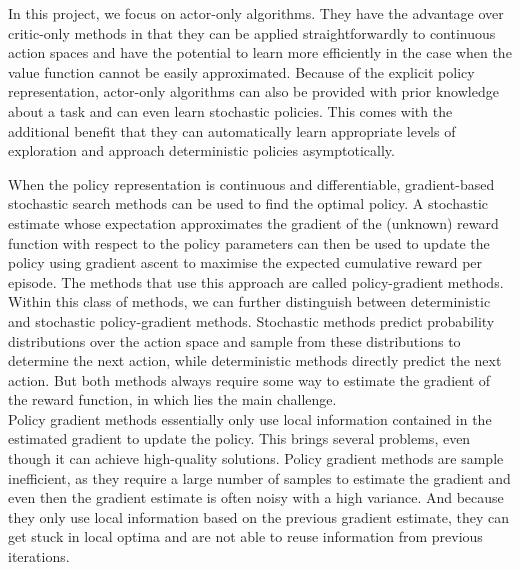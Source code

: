 \documentclass[10pt]{article}
\begin{document}
In this project, we focus on actor-only algorithms.
They have the advantage over critic-only methods in that they can be applied
straightforwardly to continuous action spaces and have the potential to learn more
efficiently in the case when the value function cannot be easily approximated.
Because of the explicit policy representation, actor-only algorithms can also be provided
with prior knowledge about a task and can even learn stochastic policies.
This comes with the additional benefit that they can automatically learn appropriate
levels of exploration and approach deterministic policies asymptotically.
\cite{RL}

When the policy representation is continuous and differentiable, gradient-based
stochastic search methods can be used to find the optimal policy.
A stochastic estimate whose expectation approximates the gradient of the (unknown) reward
function with respect to the policy parameters can then be used to update the policy
using gradient ascent to maximise the expected cumulative reward per episode.
The methods that use this approach are called policy-gradient methods.\\
Within this class of methods, we can further distinguish between deterministic and
stochastic policy-gradient methods.
Stochastic methods predict probability distributions over the action space and sample
from these distributions to determine the next action, while deterministic methods
directly predict the next action.
But both methods always require some way to estimate the gradient of the reward function,
in which lies the main challenge.\\
Policy gradient methods essentially only use local information contained in the estimated
gradient to update the policy.
This brings several problems, even though it can achieve high-quality solutions.
Policy gradient methods are sample inefficient, as they require a large number of samples
to estimate the gradient and even then the gradient estimate is often noisy with a high
variance.
And because they only use local information based on the previous gradient estimate, they
can get stuck in local optima and are not able to reuse information from previous
iterations.
\cite{slides, RL}
\end{document}
